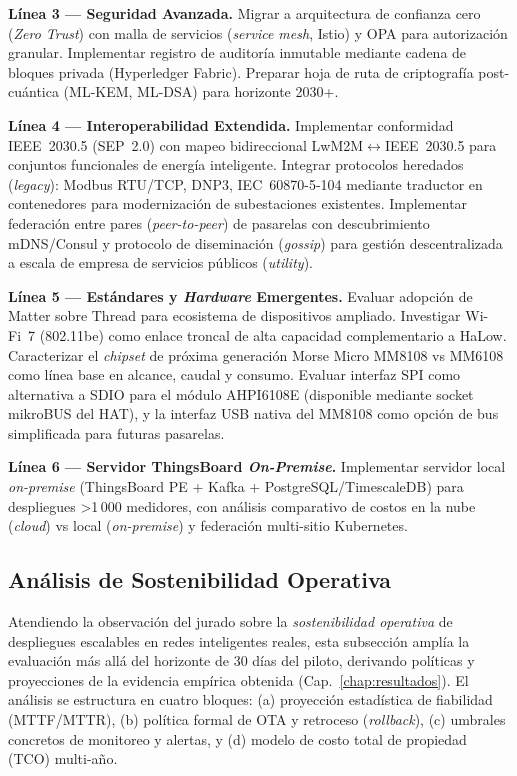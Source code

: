 \textbf{Línea 3 --- Seguridad Avanzada.} Migrar a arquitectura de confianza cero (\emph{Zero Trust}) con malla de servicios (\emph{service mesh}, Istio) y OPA para autorización granular. Implementar registro de auditoría inmutable mediante cadena de bloques privada (Hyperledger Fabric). Preparar hoja de ruta de criptografía post-cuántica (ML-KEM, ML-DSA) para horizonte 2030+.

\textbf{Línea 4 --- Interoperabilidad Extendida.} Implementar conformidad IEEE~2030.5 (SEP~2.0) con mapeo bidireccional LwM2M$\leftrightarrow$IEEE~2030.5 para conjuntos funcionales de energía inteligente. Integrar protocolos heredados (\emph{legacy}): Modbus RTU/TCP, DNP3, IEC~60870-5-104 mediante traductor en contenedores para modernización de subestaciones existentes. Implementar federación entre pares (\emph{peer-to-peer}) de pasarelas con descubrimiento mDNS/Consul y protocolo de diseminación (\emph{gossip}) para gestión descentralizada a escala de empresa de servicios públicos (\emph{utility}).

\textbf{Línea 5 --- Estándares y \emph{Hardware} Emergentes.} Evaluar adopción de Matter sobre Thread para ecosistema de dispositivos ampliado. Investigar Wi-Fi~7 (802.11be) como enlace troncal de alta capacidad complementario a HaLow. Caracterizar el \emph{chipset} de próxima generación Morse Micro MM8108 vs MM6108 como línea base en alcance, caudal y consumo. Evaluar interfaz SPI como alternativa a SDIO para el módulo AHPI6108E (disponible mediante socket mikroBUS del HAT), y la interfaz USB nativa del MM8108 como opción de bus simplificada para futuras pasarelas.

\textbf{Línea 6 --- Servidor ThingsBoard \emph{On-Premise}.} Implementar servidor local \emph{on-premise} (ThingsBoard PE + Kafka + PostgreSQL/TimescaleDB) para despliegues >1\,000 medidores, con análisis comparativo de costos en la nube (\emph{cloud}) vs local (\emph{on-premise}) y federación multi-sitio Kubernetes.

\subsection{Análisis de Sostenibilidad Operativa}
\label{sec:sostenibilidad-operativa}

Atendiendo la observación del jurado sobre la \emph{sostenibilidad operativa} de despliegues escalables en redes inteligentes reales, esta subsección amplía la evaluación más allá del horizonte de 30 días del piloto, derivando políticas y proyecciones de la evidencia empírica obtenida (Cap.~\ref{chap:resultados}). El análisis se estructura en cuatro bloques: (a) proyección estadística de fiabilidad (MTTF/MTTR), (b) política formal de OTA y retroceso (\emph{rollback}), (c) umbrales concretos de monitoreo y alertas, y (d) modelo de costo total de propiedad (TCO) multi-año.

